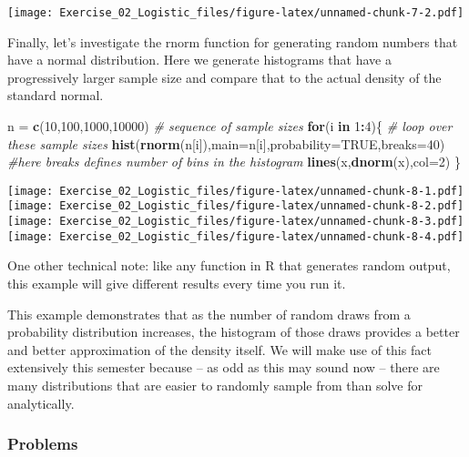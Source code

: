 \documentclass[]{article}
\newenvironment{Shaded}{\begin{snugshade}}{\end{snugshade}}
\newcommand{\KeywordTok}[1]{\textcolor[rgb]{0.13,0.29,0.53}{\textbf{#1}}}
\newcommand{\DataTypeTok}[1]{\textcolor[rgb]{0.13,0.29,0.53}{#1}}
\newcommand{\DecValTok}[1]{\textcolor[rgb]{0.00,0.00,0.81}{#1}}
\newcommand{\StringTok}[1]{\textcolor[rgb]{0.31,0.60,0.02}{#1}}
\newcommand{\CommentTok}[1]{\textcolor[rgb]{0.56,0.35,0.01}{\textit{#1}}}
\newcommand{\OtherTok}[1]{\textcolor[rgb]{0.56,0.35,0.01}{#1}}
\newcommand{\ControlFlowTok}[1]{\textcolor[rgb]{0.13,0.29,0.53}{\textbf{#1}}}
\newcommand{\OperatorTok}[1]{\textcolor[rgb]{0.81,0.36,0.00}{\textbf{#1}}}
\newcommand{\NormalTok}[1]{#1}
\begin{document}
\texttt{[image: Exercise\_02\_Logistic\_files/figure-latex/unnamed-chunk-7-2.pdf]}

Finally, let's investigate the rnorm function for generating random
numbers that have a normal distribution. Here we generate histograms
that have a progressively larger sample size and compare that to the
actual density of the standard normal.

\begin{Shaded}
\begin{Highlighting}[]
\NormalTok{n =}\StringTok{ }\KeywordTok{c}\NormalTok{(}\DecValTok{10}\NormalTok{,}\DecValTok{100}\NormalTok{,}\DecValTok{1000}\NormalTok{,}\DecValTok{10000}\NormalTok{)    }\CommentTok{# sequence of sample sizes}
\ControlFlowTok{for}\NormalTok{(i }\ControlFlowTok{in} \DecValTok{1}\OperatorTok{:}\DecValTok{4}\NormalTok{)\{          }\CommentTok{# loop over these sample sizes}
  \KeywordTok{hist}\NormalTok{(}\KeywordTok{rnorm}\NormalTok{(n[i]),}\DataTypeTok{main=}\NormalTok{n[i],}\DataTypeTok{probability=}\OtherTok{TRUE}\NormalTok{,}\DataTypeTok{breaks=}\DecValTok{40}\NormalTok{)  }
                \CommentTok{#here breaks defines number of bins in the histogram}
  \KeywordTok{lines}\NormalTok{(x,}\KeywordTok{dnorm}\NormalTok{(x),}\DataTypeTok{col=}\DecValTok{2}\NormalTok{)}
\NormalTok{\}}
\end{Highlighting}
\end{Shaded}

\texttt{[image: Exercise\_02\_Logistic\_files/figure-latex/unnamed-chunk-8-1.pdf]}
\texttt{[image: Exercise\_02\_Logistic\_files/figure-latex/unnamed-chunk-8-2.pdf]}
\texttt{[image: Exercise\_02\_Logistic\_files/figure-latex/unnamed-chunk-8-3.pdf]}
\texttt{[image: Exercise\_02\_Logistic\_files/figure-latex/unnamed-chunk-8-4.pdf]}

One other technical note: like any function in R that generates random
output, this example will give different results every time you run it.

This example demonstrates that as the number of random draws from a
probability distribution increases, the histogram of those draws
provides a better and better approximation of the density itself. We
will make use of this fact extensively this semester because -- as odd
as this may sound now -- there are many distributions that are easier to
randomly sample from than solve for analytically.

\subsubsection{Problems}\label{problems-1}
\end{document}
